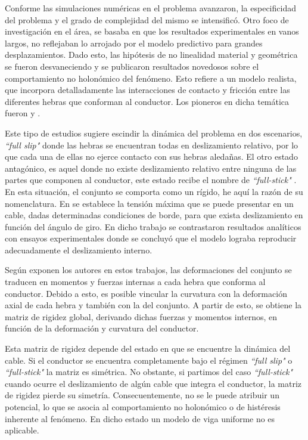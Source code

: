 Conforme las simulaciones numéricas en el problema avanzaron, la especificidad del problema y el grado de complejidad del mismo se intensificó. Otro foco de investigación en el área, se basaba en que los resultados experimentales en vanos largos, no reflejaban lo arrojado por el modelo predictivo para grandes desplazamientos. Dado esto, las hipótesis de no linealidad material y geométrica se fueron desvaneciendo y se publicaron resultados novedosos sobre el comportamiento no holonómico del fenómeno. Esto refiere a un modelo realista, que incorpora detalladamente las interacciones de contacto y fricción entre las diferentes hebras que conforman al conductor. Los pioneros en dicha temática fueron \cite {Papailiou1997} y \cite{Kutterer1992}.

Este tipo de estudios sugiere escindir la dinámica del problema en dos escenarios, \textit{``full slip"} donde las hebras se encuentran todas en deslizamiento relativo, por lo que cada una de ellas no ejerce contacto con sus hebras aledañas. El otro estado antagónico, es aquel donde no existe deslizamiento relativo entre ninguna de las partes que componen al conductor, este estado recibe el nombre de \textit{``full-stick" }. En esta situación, el conjunto se comporta como un rígido, he aquí la razón de su nomenclatura. En \cite {Papailiou1997} se establece la tensión máxima que se puede presentar en un cable, dadas determinadas condiciones de borde, para que exista deslizamiento en función del ángulo de giro. En dicho trabajo se contrastaron resultados analíticos con ensayos experimentales donde se concluyó que el modelo lograba reproducir adecuadamente el deslizamiento interno. 

Según exponen los autores en estos trabajos, las deformaciones del conjunto se traducen en momentos y fuerzas internas a cada hebra que conforma al conductor. Debido a esto, es posible vincular la curvatura con la deformación axial de cada hebra y también con la del conjunto. A partir de esto, se obtiene la matriz de rigidez global, derivando dichas fuerzas y momentos internos, en función de la deformación y curvatura del conductor.

Esta matriz de rigidez depende del estado en que se encuentre la dinámica del cable. Si el conductor se encuentra completamente bajo el régimen \textit{``full slip"} o  \textit{``full-stick" } la matriz es simétrica. No obstante, si partimos del caso \textit{``full-stick" } cuando ocurre el deslizamiento de algún cable que integra el conductor, la matriz de rigidez pierde su simetría. Consecuentemente, no se le puede atribuir un potencial, lo que se asocia al comportamiento no holonómico o de histéresis inherente al fenómeno. En dicho estado un modelo de viga uniforme no es aplicable.

